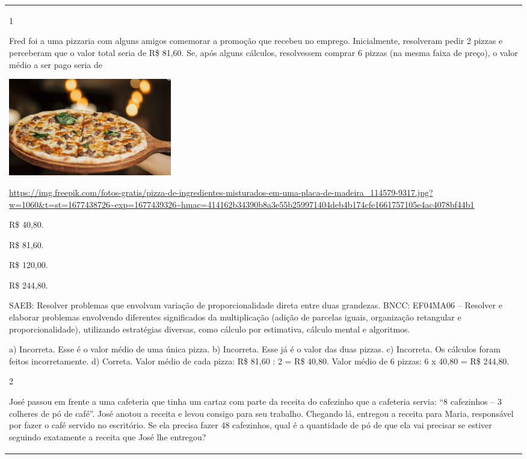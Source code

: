 \begin{mdframed}[linewidth=2pt,linecolor=salmao,roundcorner=2pt]
\begin{escolha}
{{{\begin{longtable}[]{@{}l@{}}
\begin{itemize}
\num{1}

Fred foi a uma pizzaria com alguns amigos comemorar a promoção que recebeu no emprego.
Inicialmente, resolveram pedir 2 pizzas e perceberam que o valor total
seria de R\$ 81,60. Se, após alguns cálculos, resolvessem comprar 6
pizzas (na mesma faixa de preço), o valor médio a ser pago seria de

\includegraphics[width=2.80000in,height=1.66867in]{media/image132.png}

\url{https://img.freepik.com/fotos-gratis/pizza-de-ingredientes-misturados-em-uma-placa-de-madeira_114579-9317.jpg?w=1060\&t=st=1677438726~exp=1677439326~hmac=414162b34390b8a3e55b259971404deb4b174cfe1661757105e4ac4078bf44b1}

\begin{escolha}
\item
  R\$ 40,80.
\item
  R\$ 81,60.
\item
  R\$ 120,00.
\item
  R\$ 244,80.
\end{escolha}

SAEB: Resolver problemas que envolvam variação de proporcionalidade direta entre duas grandezas.
BNCC: EF04MA06 -- Resolver e elaborar problemas envolvendo diferentes significados da multiplicação
(adição de parcelas iguais, organização retangular e proporcionalidade), utilizando estratégias
diversas, como cálculo por estimativa, cálculo mental e algoritmos.

a)  Incorreta. Esse é o valor médio de uma única pizza.
b)  Incorreta. Esse já é o valor das duas pizzas.
c)  Incorreta. Os cálculos foram feitos incorretamente.
d)  Correta.  Valor médio de cada pizza: R\$ 81,60 : 2 = R\$ 40,80. Valor médio de 6 pizzas: 6 x 40,80 = R\$ 244,80.


\num{2}

José passou em frente a uma cafeteria que tinha um cartaz com parte da
receita do cafezinho que a cafeteria servia: ``8 cafezinhos -- 3 colheres de pó de café''.
José anotou a receita e levou consigo para seu trabalho. Chegando lá,
entregou a receita para Maria, responsável por fazer o café servido no
escritório. Se ela precisa fazer 48 cafezinhos, qual é a
quantidade de pó de que ela vai precisar se estiver seguindo exatamente a
receita que José lhe entregou?


\end{itemize}
\end{longtable}}}}
\end{escolha}
\end{mdframed}
